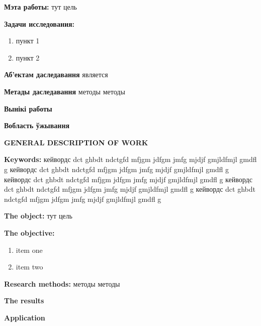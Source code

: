 \textbf{Мэта работы:} тут цель

\textbf{Задачи исследования:}
\begin{enumerate}
	\item пункт 1
	\item пункт 2
\end{enumerate}

\textbf{Аб’ектам даследавання} является


\textbf{Метады даследавання} методы методы

\textbf{Вынікі работы}

\textbf{Вобласть ўжывання}


\newpage
{}
\begin{center}
	\textbf{\large GENERAL DESCRIPTION OF WORK}
\end{center}

\textbf{Keywords:} кейвордс dct ghbdt ndctgfd mfjgm jdfgm jmfg mjdjf gmjldfmjl gmdfl g
кейвордс dct ghbdt ndctgfd mfjgm jdfgm jmfg mjdjf gmjldfmjl gmdfl g
кейвордс dct ghbdt ndctgfd mfjgm jdfgm jmfg mjdjf gmjldfmjl gmdfl g
кейвордс dct ghbdt ndctgfd mfjgm jdfgm jmfg mjdjf gmjldfmjl gmdfl g
кейвордс dct ghbdt ndctgfd mfjgm jdfgm jmfg mjdjf gmjldfmjl gmdfl g

\textbf{The object:} тут цель

\textbf{The objective:}
\begin{enumerate}
	\item item one
	\item item two
\end{enumerate}


\textbf{Research methods:} методы методы

\textbf{The results}

\textbf{Application}